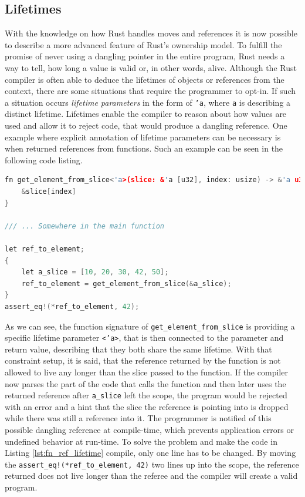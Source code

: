 \subsection{Lifetimes}

With the knowledge on how Rust handles moves and references it is now possible to describe a more advanced feature of Rust's ownership model. To fulfill the promise of never using a dangling pointer in the entire program, Rust needs a way to tell, how long a value is valid or, in other words, alive. Although the Rust compiler is often able to deduce the lifetimes of objects or references from the context, there are some situations that require the programmer to opt-in. If such a situation occurs \textit{lifetime parameters} in the form of \texttt{'a}, where \texttt{a} is describing a distinct lifetime. Lifetimes enable the compiler to reason about how values are used and allow it to reject code, that would produce a dangling reference. One example where explicit annotation of lifetime parameters can be necessary is when returned references from functions. Such an example can be seen in the following code listing.\\

\begin{lstlisting}[caption={Returning a reference from a function, needing an explicit lifetime annotation. Compilation error because of a possible dangling reference.}, label={lst:fn_ref_lifetime}, language=C++]
fn get_element_from_slice<'a>(slice: &'a [u32], index: usize) -> &'a u32 {
	&slice[index]
}

/// ... Somewhere in the main function

let ref_to_element;
{
	let a_slice = [10, 20, 30, 42, 50];
	ref_to_element = get_element_from_slice(&a_slice);
}
assert_eq!(*ref_to_element, 42);

\end{lstlisting}

\noindent
As we can see, the function signature of \texttt{get\_element\_from\_slice} is providing a specific lifetime parameter \texttt{<'a>}, that is then connected to the parameter and return value, describing that they both share the same lifetime. With that constraint setup, it is said, that the reference returned by the function is not allowed to live any longer than the slice passed to the function. If the compiler now parses the part of the code that calls the function and then later uses the returned reference after \texttt{a\_slice} left the scope, the program would be rejected with an error and a hint that the slice the reference is pointing into is dropped while there was still a reference into it. The programmer is notified of this possible dangling reference at compile-time, which prevents application errors or undefined behavior at run-time. To solve the problem and make the code in Listing \ref{lst:fn_ref_lifetime} compile, only one line has to be changed. By moving the \texttt{assert\_eq!(*ref\_to\_element, 42)} two lines up into the scope, the reference returned does not live longer than the referee and the compiler will create a valid program.

